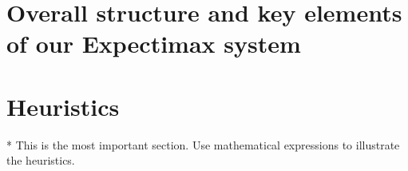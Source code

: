 \section{Overall structure and key elements of our Expectimax system}

\section{Heuristics}
* This is the most important section. Use mathematical expressions to illustrate the heuristics.